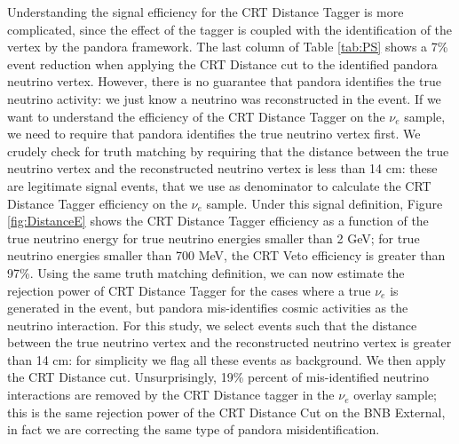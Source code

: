 Understanding the signal efficiency for the CRT Distance Tagger is more complicated, since the effect of the tagger is coupled with the identification of the vertex by the pandora framework. The last column of  Table \ref{tab:PS} shows a 7\% event reduction when applying the CRT Distance cut to the identified pandora neutrino vertex. However, there is no guarantee that pandora identifies the true neutrino activity: we just know a neutrino was reconstructed in the event.
If we want to understand the efficiency of the CRT Distance Tagger on the $\nu_e$ sample, we need to require that pandora identifies  the true neutrino vertex first. We crudely check for truth matching by requiring that the distance between the true neutrino vertex and the reconstructed neutrino vertex is less than 14 cm: these are legitimate signal events, that we use as denominator to calculate the CRT Distance Tagger efficiency on the $\nu_e$ sample.  Under this signal definition, Figure \ref{fig:DistanceE} shows the CRT Distance Tagger efficiency as a function of the true neutrino energy for true neutrino energies smaller than 2 GeV;  for true neutrino energies smaller than 700 MeV, the CRT Veto efficiency is greater than 97\%. Using the same truth matching definition, we can now estimate the rejection power of CRT Distance Tagger for the cases where a true $\nu_e$ is generated in the event, but pandora mis-identifies cosmic activities as the neutrino interaction. For this study, we select events such that the distance between the true neutrino vertex and the reconstructed neutrino vertex is greater than 14 cm: for simplicity we flag all these events as background. We then apply the CRT Distance cut. Unsurprisingly, 19\% percent of mis-identified neutrino interactions are removed by the CRT Distance tagger in the $\nu_e$ overlay sample; this is the same rejection power of the CRT Distance Cut on the BNB External, in fact we are correcting the same type of pandora misidentification.



